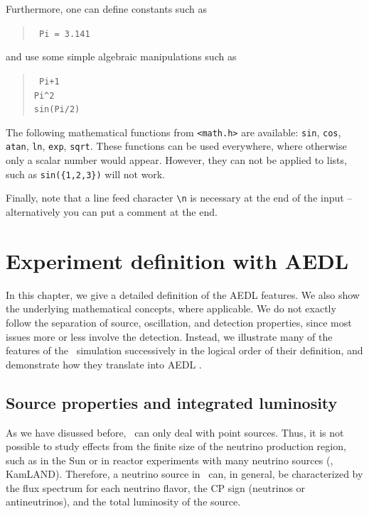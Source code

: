 Furthermore, one can define constants such as
\begin{quote}
{\tt
Pi = 3.141
}
\end{quote}
and use some simple algebraic manipulations such as
\begin{quote}
{\tt
Pi+1\\
\verb+Pi^2+\\
sin(Pi/2)\\
}
\end{quote}
The following mathematical functions from {\tt <math.h>} are available: 
{\tt sin}, {\tt cos}, {\tt atan}, {\tt ln}, {\tt exp}, {\tt sqrt}. 
These functions can be used everywhere, where
otherwise only a scalar number would appear. However, they can not be
applied to lists, such as {\tt sin(\{1,2,3\})} will not work. 

Finally, note that a line feed character \verb+\n+ is necessary at
 the end of the input -- alternatively you can put a comment at the end.


\chapter{Experiment definition with AEDL}

In this chapter, we give a detailed definition of the AEDL features. We also show the underlying mathematical concepts, where applicable. We do not exactly follow the separation of source, oscillation, and detection properties, since most issues more or less involve the detection. Instead,
we illustrate many of the features of the \GLOBES\ simulation successively
in the logical order of their definition, and demonstrate how they translate into AEDL .

\section{Source properties and integrated luminosity}
\label{sec:source}

As we have disussed before, \GLOBES\ can only deal with point sources. Thus,  it is not possible to study effects from the finite size of the neutrino production region, such as in the Sun or in reactor experiments with many
neutrino sources (\eg, KamLAND). Therefore, a neutrino source in \GLOBES\ can, in general, be characterized by the flux spectrum for each neutrino flavor, the CP sign (neutrinos or antineutrinos), and the total luminosity
of the source.

